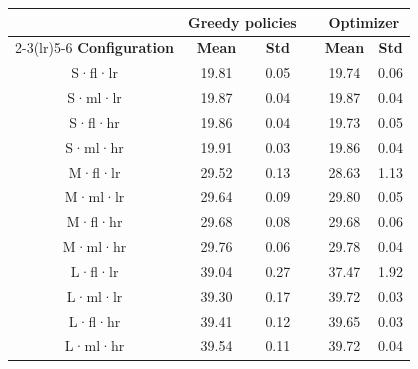 \begin{tabular}{@{}c cc c cc@{}}
\toprule
& \multicolumn{2}{c}{\textbf{Greedy policies}} & & \multicolumn{2}{c}{\textbf{Optimizer}} \\
\cmidrule(lr){2-3}\cmidrule(lr){5-6}
\textbf{Configuration} & \textbf{Mean} & \textbf{Std} & & \textbf{Mean} & \textbf{Std} \\
\midrule
S·fl·lr & 19.81 & 0.05 & & 19.74 & 0.06 \\
S·ml·lr & 19.87 & 0.04 & & 19.87 & 0.04 \\
S·fl·hr & 19.86 & 0.04 & & 19.73 & 0.05 \\
S·ml·hr & 19.91 & 0.03 & & 19.86 & 0.04 \\
\addlinespace
M·fl·lr & 29.52 & 0.13 & & 28.63 & 1.13 \\
M·ml·lr & 29.64 & 0.09 & & 29.80 & 0.05 \\
M·fl·hr & 29.68 & 0.08 & & 29.68 & 0.06 \\
M·ml·hr & 29.76 & 0.06 & & 29.78 & 0.04 \\
\addlinespace
L·fl·lr & 39.04 & 0.27 & & 37.47 & 1.92 \\
L·ml·lr & 39.30 & 0.17 & & 39.72 & 0.03 \\
L·fl·hr & 39.41 & 0.12 & & 39.65 & 0.03 \\
L·ml·hr & 39.54 & 0.11 & & 39.72 & 0.04 \\
\bottomrule
\end{tabular}